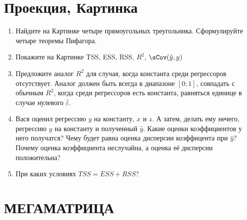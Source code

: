 \documentclass[pdftex,12pt,a4paper]{article}
\def \hy{\hat{y}}
\def \he{\hat{\varepsilon}}
\newcommand{\solution}[1]{}
\begin{document}
\section{Проекция, Картинка}
\begin{enumerate}
\item Найдите на Картинке четыре прямоугольных треугольника. Сформулируйте четыре теоремы Пифагора.
\solution{$\sum y_i^2=\sum \hy_i^2+\sum \he_i^2$, $TSS=ESS+RSS$, }

\item Покажите на Картинке TSS, ESS, RSS, $R^2$, $\sCov(\hy,y)$
\solution{}


\item Предложите аналог $R^2$ для случая, когда константа среди регрессоров отсутствует. Аналог должен быть всегда в диапазоне $[0;1]$, совпадать с обычным $R^2$, когда среди регрессоров есть константа, равняться единице в случае нулевого $\he$.
\solution{Спроецируем единичный столбец на <<плоскость>>, обозначим его $1'$. Делаем проекцию $y$ на <<плоскость>> и на $1'$. Далее аналогично. }

\item Вася оценил регрессию $y$ на константу, $x$ и $z$. А затем, делать ему нечего, регрессию $y$ на константу и полученный $\hy$. Какие оценки коэффициентов у него получатся? Чему будет равна оценка дисперсии коэффицента при $\hy$? Почему оценка коэффициента неслучайна, а оценка её дисперсии положительна?
\solution{Проекция $y$ на $\hy$ это $\hy$, поэтому оценки коэффициентов будут 0 и 1. Оценка дисперсии $\frac{RSS}{(n-2)ESS}$. Нарушены предпосылки теоремы Гаусса-Маркова, например, ошибки новой модели в сумме дают 0, значит коррелированы. } 


\item При каких условиях $TSS=ESS+RSS$?
\solution{Либо в регрессию включена константа, либо единичный столбец (тут была опечатка, столбей) можно получить как линейную комбинацию регрессоров, например, включены дамми-переменные для каждого возможного значения качественной переменной.}


\end{enumerate}

\section{МЕГАМАТРИЦА}
\end{document}
